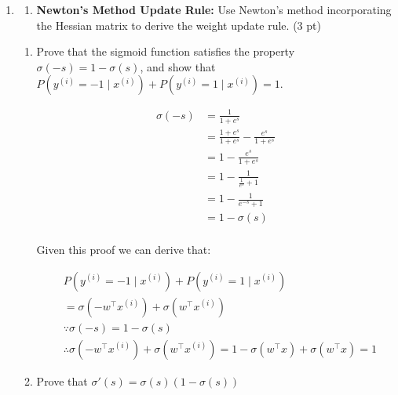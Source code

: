 \documentclass{article}
\theoremstyle{definition}
\theoremstyle{remark}
\newenvironment{Q}
        {%
          \clearpage
          \item
        }
        {%
          \phantom{s} %
          \bigskip
        }
\begin{document}
\begin{enumerate}[font={\Large\bfseries},left=0pt]
\begin{Q}
\begin{enumerate}
			\item \textbf{Newton’s Method Update Rule:} Use Newton’s method incorporating the Hessian matrix to derive the weight update rule.  (3 pt)

		\end{enumerate}
	\end{Q}
	\begin{tcolorbox}
		\begin{enumerate}
			\item Prove that the sigmoid function satisfies the property $\sigma(-s) = 1 - \sigma(s)$,
			      and show that $P(y^{(i)} = -1 \mid x^{(i)}) + P(y^{(i)} = 1 \mid x^{(i)}) = 1$.

			      \begin{align}
				      \sigma(-s) & = \frac{1}{1 + e^s}                             \\
				                 & = \frac{1 + e^s}{1 + e^s} - \frac{e^s}{1 + e^s} \\
				                 & = 1 - \frac{e^s}{1 + e^s}                       \\
				                 & = 1 - \frac{1}{\frac{1}{e^s} + 1}               \\
				                 & = 1 - \frac{1}{e^{-s} + 1}                      \\
				                 & = 1 - \sigma(s)                                 \\
			      \end{align}

			      Given this proof we can derive that:

			      \begin{align}
				       & P(y^{(i)} = -1 \mid x^{(i)}) + P(y^{(i)} = 1 \mid x^{(i)})                                                                      \\
				       & = \sigma(-w^\intercal x^{(i)}) + \sigma{(w^\intercal x^{(i)})}                                                                  \\
				       & \because \sigma(-s) = 1 - \sigma(s)                                                                                             \\
				       & \therefore \sigma(-w^\intercal x^{(i)}) + \sigma{(w^\intercal x^{(i)})} = 1 - \sigma(w^\intercal x) + \sigma(w^\intercal x) = 1
			      \end{align}

			\item Prove that $\sigma'(s) = \sigma(s)(1 - \sigma(s))$


\end{enumerate}
\end{tcolorbox}
\end{enumerate}
\end{document}
